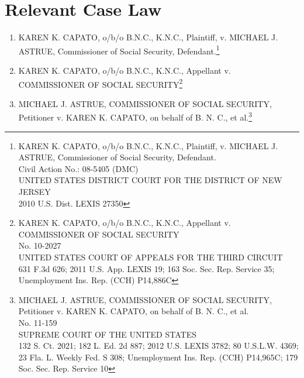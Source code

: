 \documentclass[letterpaper,10pt]{article}
\begin{document}
\section*{Relevant Case Law}
\begin{enumerate}
\item KAREN K. CAPATO, o/b/o B.N.C., K.N.C., Plaintiff, v. MICHAEL J. ASTRUE, Commissioner of Social Security, Defendant.\footnote{\label{Original Case}KAREN K. CAPATO, o/b/o B.N.C., K.N.C., Plaintiff, v. MICHAEL J. ASTRUE, Commissioner of Social Security, Defendant.\\
Civil Action No.: 08-5405 (DMC)\\
UNITED STATES DISTRICT COURT FOR THE DISTRICT OF NEW JERSEY\\
2010 U.S. Dist. LEXIS 27350}
\item KAREN K. CAPATO, o/b/o B.N.C., K.N.C., Appellant v. COMMISSIONER OF SOCIAL SECURITY\footnote{\label{Appealed}KAREN K. CAPATO, o/b/o B.N.C., K.N.C., Appellant v. COMMISSIONER OF SOCIAL SECURITY\\
No. 10-2027\\
UNITED STATES COURT OF APPEALS FOR THE THIRD CIRCUIT\\
631 F.3d 626; 2011 U.S. App. LEXIS 19; 163 Soc. Sec. Rep. Service 35; Unemployment Ins. Rep. (CCH) P14,886C}
\item MICHAEL J. ASTRUE, COMMISSIONER OF SOCIAL SECURITY, Petitioner v. KAREN K. CAPATO, on behalf of B. N. C., et al.\footnote{\label{US Supreme Court Ruling}MICHAEL J. ASTRUE, COMMISSIONER OF SOCIAL SECURITY, Petitioner v. KAREN K. CAPATO, on behalf of B. N. C., et al.\\
No. 11-159\\
SUPREME COURT OF THE UNITED STATES\\
132 S. Ct. 2021; 182 L. Ed. 2d 887; 2012 U.S. LEXIS 3782; 80 U.S.L.W. 4369; 23 Fla. L. Weekly Fed. S 308; Unemployment Ins. Rep. (CCH) P14,965C; 179 Soc. Sec. Rep. Service 10}
\end{enumerate}
\end{document}
